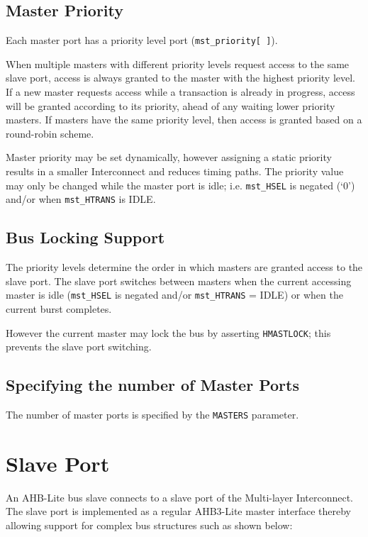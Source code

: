 \subsection{Master Priority}\label{master-priority}

Each master port has a priority level port (\texttt{mst\_priority[\,]}).

When multiple masters with different priority levels request access to
the same slave port, access is always granted to the master with the
highest priority level. If a new master requests access while a
transaction is already in progress, access will be granted according to
its priority, ahead of any waiting lower priority masters. If masters
have the same priority level, then access is granted based on a
round-robin scheme.

Master priority may be set dynamically, however assigning a static
priority results in a smaller Interconnect and reduces timing paths. The
priority value may only be changed while the master port is idle; i.e.
\texttt{mst\_HSEL} is negated (`0') and/or when \texttt{mst\_HTRANS} is IDLE.

\subsection{Bus Locking Support}\label{bus-locking-support}

The priority levels determine the order in which masters are granted
access to the slave port. The slave port switches between masters when
the current accessing master is idle (\texttt{mst\_HSEL} is negated and/or
\texttt{mst\_HTRANS} = IDLE) or when the current burst completes.

However the current master may lock the bus by asserting \texttt{HMASTLOCK}; this
prevents the slave port switching.

\subsection{Specifying the number of Master
Ports}\label{specifying-the-number-of-master-ports}

The number of master ports is specified by the \texttt{MASTERS} parameter.

\section{Slave Port}\label{slave-port}

An AHB-Lite bus slave connects to a slave port of the Multi-layer
Interconnect. The slave port is implemented as a regular AHB3-Lite master
interface thereby allowing support for complex bus structures such as
shown below:

